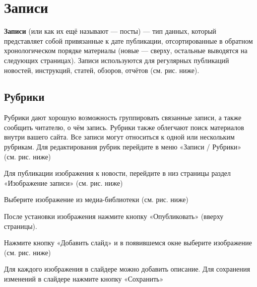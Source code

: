 \chapter{Записи}
\label{sec:chapter_posts}

\textbf{Записи} (или как их ещё называют — посты) — тип данных, который представляет собой привязанные к дате публикации, отсортированные в обратном хронологическом порядке материалы (новые — сверху, остальные выводятся на следующих страницах).
Записи используются для регулярных публикаций новостей, инструкций, статей, обзоров, отчётов (см. рис. ниже).


\section{Рубрики}
\label{sec:part_cat_posts}

Рубрики дают хорошую возможность группировать связанные записи, а также сообщить читателю, о чём запись. Рубрики также облегчают поиск материалов внутри вашего сайта.
Все записи могут относиться к одной или нескольким рубрикам. Для редактирования рубрик перейдите в меню «Записи / Рубрики» (см. рис. ниже)




Для публикации изображения к новости, перейдите в низ страницы раздел «Изображение записи» (см. рис. ниже)




Выберите изображение из медиа-библиотеки (см. рис. ниже)




После установки изображения нажмите кнопку «Опубликовать» (вверху страницы).


Нажмите кнопку «Добавить слайд» и в появившемся окне выберите изображение (см. рис. ниже)


Для каждого изображения в слайдере можно добавить описание. Для сохранения изменений в слайдере нажмите кнопку «Сохранить»


